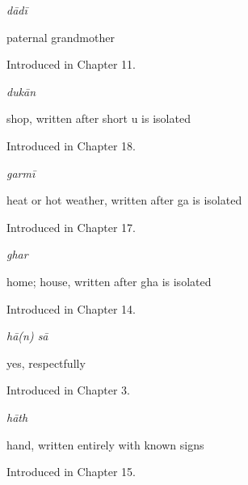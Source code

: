 \noindent\begin{minipage}[t]{\linewidth}
\raggedright
\textbf{}\enspace\emph{dādī}\par
\small paternal grandmother\par
\footnotesize Introduced in Chapter 11.
\end{minipage}\par\medskip

\noindent\begin{minipage}[t]{\linewidth}
\raggedright
\textbf{}\enspace\emph{dukān}\par
\small shop, written after short u is isolated\par
\footnotesize Introduced in Chapter 18.
\end{minipage}\par\medskip

\noindent\begin{minipage}[t]{\linewidth}
\raggedright
\textbf{}\enspace\emph{garmī}\par
\small heat or hot weather, written after ga is isolated\par
\footnotesize Introduced in Chapter 17.
\end{minipage}\par\medskip

\noindent\begin{minipage}[t]{\linewidth}
\raggedright
\textbf{}\enspace\emph{ghar}\par
\small home; house, written after gha is isolated\par
\footnotesize Introduced in Chapter 14.
\end{minipage}\par\medskip

\noindent\begin{minipage}[t]{\linewidth}
\raggedright
\textbf{ }\enspace\emph{hā(n) sā}\par
\small yes, respectfully\par
\footnotesize Introduced in Chapter 3.
\end{minipage}\par\medskip

\noindent\begin{minipage}[t]{\linewidth}
\raggedright
\textbf{}\enspace\emph{hāth}\par
\small hand, written entirely with known signs\par
\footnotesize Introduced in Chapter 15.
\end{minipage}\par\medskip

